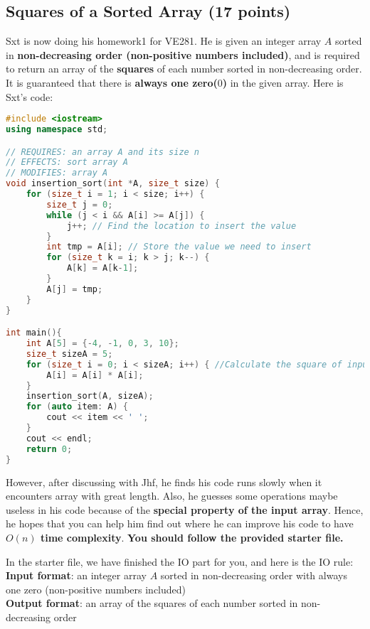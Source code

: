 \documentclass[11pt]{exam}
\begin{document}
\subsection{Squares of a Sorted Array (17 points)}
Sxt is now doing his homework1 for VE281. He is given an integer array $A$ sorted in \textbf{non-decreasing order (non-positive numbers included)}, and is required to return an array of the \textbf{squares} of each number sorted in non-decreasing order. It is guaranteed that there is \textbf{always one zero($0$)} in the given array. 
Here is Sxt's code:
\begin{lstlisting}[language=c++]
#include <iostream>
using namespace std;

// REQUIRES: an array A and its size n
// EFFECTS: sort array A
// MODIFIES: array A
void insertion_sort(int *A, size_t size) {
    for (size_t i = 1; i < size; i++) {
        size_t j = 0;
        while (j < i && A[i] >= A[j]) {
            j++; // Find the location to insert the value
        }
        int tmp = A[i]; // Store the value we need to insert
        for (size_t k = i; k > j; k--) {
            A[k] = A[k-1];
        }
        A[j] = tmp;
    }
}

int main(){
    int A[5] = {-4, -1, 0, 3, 10};
    size_t sizeA = 5;
    for (size_t i = 0; i < sizeA; i++) { //Calculate the square of input array
        A[i] = A[i] * A[i];
    }
    insertion_sort(A, sizeA);
    for (auto item: A) {
        cout << item << ' ';
    }
    cout << endl;
    return 0;
}
\end{lstlisting}

However, after discussing with Jhf, he finds his code runs slowly when it encounters array with great length. Also, he guesses some operations maybe useless in his code because of the \textbf{special property of the input array}. Hence, he hopes that you can help him find out where he can improve his code to have \textbf{$O(n)$ time complexity}. \textbf{You should follow the provided starter file.} 
\newline

In the starter file, we have finished the IO part for you, and here is the IO rule:\\
\textbf{Input format}: an integer array $A$ sorted in non-decreasing order with always one zero (non-positive numbers included)\\
\textbf{Output format}: an array of the squares of each number sorted in non-decreasing order
\newline
\vspace{0.2cm}
\end{document}
